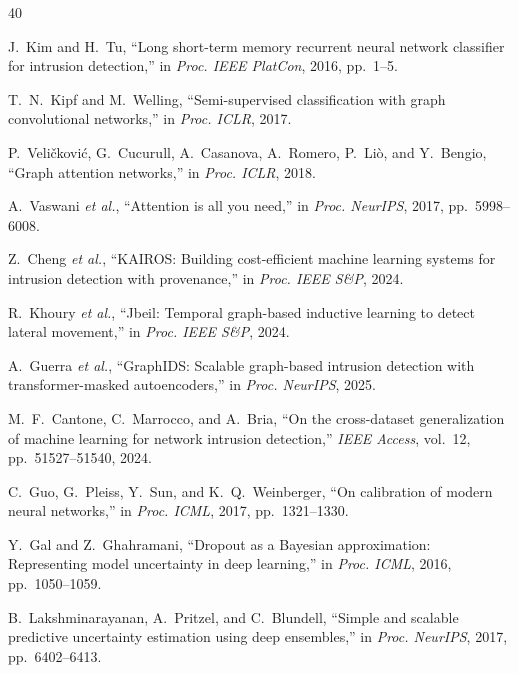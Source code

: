 \documentclass[journal]{IEEEtran}
\begin{document}
\vspace{-2pt}
\enlargethispage{2\baselineskip}
\begin{thebibliography}{40}

J.~Kim and H.~Tu, ``Long short-term memory recurrent neural network classifier for intrusion detection,'' in \emph{Proc. IEEE PlatCon}, 2016, pp.~1--5.

T.~N.~Kipf and M.~Welling, ``Semi-supervised classification with graph convolutional networks,'' in \emph{Proc. ICLR}, 2017.

P.~Veli\v{c}kovi\'c, G.~Cucurull, A.~Casanova, A.~Romero, P.~Li\`{o}, and Y.~Bengio, ``Graph attention networks,'' in \emph{Proc. ICLR}, 2018.

A.~Vaswani \emph{et al.}, ``Attention is all you need,'' in \emph{Proc. NeurIPS}, 2017, pp.~5998--6008.

Z.~Cheng \emph{et al.}, ``KAIROS: Building cost-efficient machine learning systems for intrusion detection with provenance,'' in \emph{Proc. IEEE S\&P}, 2024.

R.~Khoury \emph{et al.}, ``Jbeil: Temporal graph-based inductive learning to detect lateral movement,'' in \emph{Proc. IEEE S\&P}, 2024.

A.~Guerra \emph{et al.}, ``GraphIDS: Scalable graph-based intrusion detection with transformer-masked autoencoders,'' in \emph{Proc. NeurIPS}, 2025.

M.~F.~Cantone, C.~Marrocco, and A.~Bria, ``On the cross-dataset generalization of machine learning for network intrusion detection,'' \emph{IEEE Access}, vol.~12, pp.~51527--51540, 2024.

C.~Guo, G.~Pleiss, Y.~Sun, and K.~Q.~Weinberger, ``On calibration of modern neural networks,'' in \emph{Proc. ICML}, 2017, pp.~1321--1330.

Y.~Gal and Z.~Ghahramani, ``Dropout as a Bayesian approximation: Representing model uncertainty in deep learning,'' in \emph{Proc. ICML}, 2016, pp.~1050--1059.

B.~Lakshminarayanan, A.~Pritzel, and C.~Blundell, ``Simple and scalable predictive uncertainty estimation using deep ensembles,'' in \emph{Proc. NeurIPS}, 2017, pp.~6402--6413.


\end{thebibliography}
\end{document}
